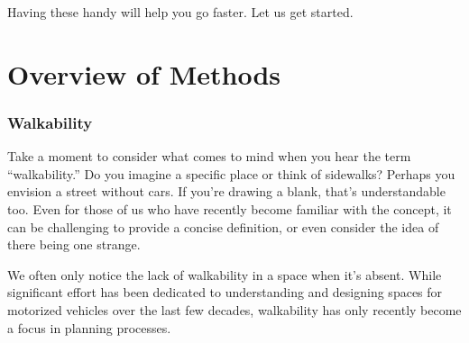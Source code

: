 \documentclass[
]{latex/krantz}
\begin{document}
Having these handy will help you go faster. Let us get started.

\hypertarget{part-overview-of-methods}{%
\part{Overview of Methods}\label{part-overview-of-methods}}

\hypertarget{walkability}{%
\section{Walkability}\label{walkability}}

Take a moment to consider what comes to mind when you hear the term ``walkability.'' Do you imagine a specific place or think of sidewalks? Perhaps you envision a street without cars. If you're drawing a blank, that's understandable too. Even for those of us who have recently become familiar with the concept, it can be challenging to provide a concise definition, or even consider the idea of there being one strange.

We often only notice the lack of walkability in a space when it's absent. While significant effort has been dedicated to understanding and designing spaces for motorized vehicles over the last few decades, walkability has only recently become a focus in planning processes.
\end{document}
